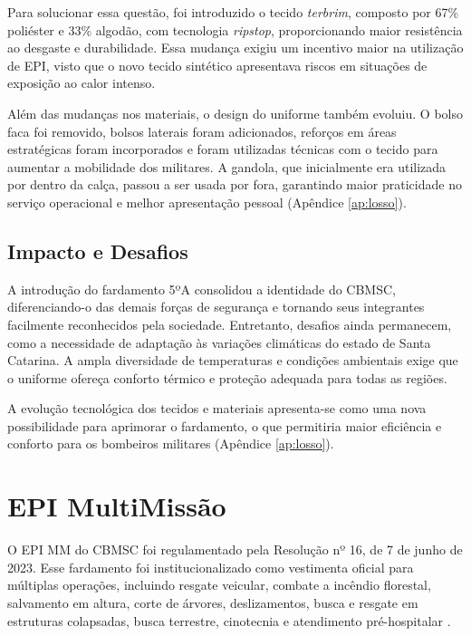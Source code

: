 Para solucionar essa questão, foi introduzido o tecido \textit{terbrim}, composto por 67\% poliéster
 e 33\% algodão, com tecnologia \textit{ripstop}, proporcionando maior resistência ao desgaste 
 e durabilidade. Essa mudança exigiu um incentivo maior na utilização de 
 \acrfull{EPI}, visto que o novo tecido sintético apresentava riscos em situações de exposição 
 ao calor intenso.

Além das mudanças nos materiais, o design do uniforme também evoluiu. O bolso faca foi removido, 
bolsos laterais foram adicionados, reforços em áreas estratégicas foram incorporados e foram utilizadas
técnicas com o tecido para aumentar a mobilidade dos militares. A gandola, que inicialmente 
era utilizada por dentro da calça, passou a ser usada por fora, garantindo maior praticidade no 
serviço operacional e melhor apresentação pessoal (Apêndice \ref{ap:losso}).

\subsection{Impacto e Desafios}

A introdução do fardamento 5ºA consolidou a identidade do \acrshort{CBMSC}, diferenciando-o das 
demais forças de segurança e tornando seus integrantes facilmente reconhecidos pela sociedade. 
Entretanto, desafios ainda permanecem, como a necessidade de adaptação às variações climáticas 
do estado de Santa Catarina. A ampla diversidade de temperaturas e condições ambientais exige 
que o uniforme ofereça conforto térmico e proteção adequada para todas as regiões.

A evolução tecnológica dos tecidos e materiais apresenta-se como uma nova possibilidade
 para aprimorar o fardamento, o que permitiria maior eficiência e conforto para os bombeiros 
 militares (Apêndice \ref{ap:losso}). 


\section{EPI MultiMissão}

O \acrshort{EPI} \acrfull{MM} do \acrshort{CBMSC} foi regulamentado pela Resolução nº 16, de 7 de junho de 2023. Esse fardamento foi institucionalizado como vestimenta oficial para múltiplas operações, incluindo resgate veicular, combate a incêndio florestal, salvamento em altura, corte de árvores, deslizamentos, busca e resgate em estruturas colapsadas, busca terrestre, cinotecnia e atendimento pré-hospitalar \cite{res16}.

